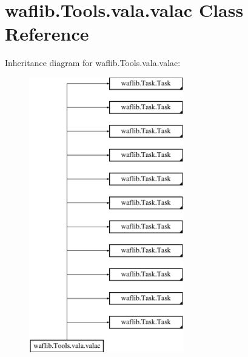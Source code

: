\hypertarget{classwaflib_1_1_tools_1_1vala_1_1valac}{}\section{waflib.\+Tools.\+vala.\+valac Class Reference}
\label{classwaflib_1_1_tools_1_1vala_1_1valac}
Inheritance diagram for waflib.\+Tools.\+vala.\+valac\+:\begin{figure}[H]
\begin{center}
\leavevmode
\includegraphics[height=12.000000cm]{classwaflib_1_1_tools_1_1vala_1_1valac}
\end{center}
\end{figure}
